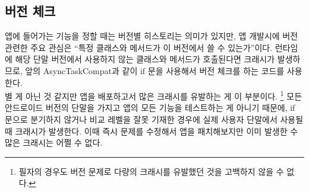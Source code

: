 \subsection{버전 체크}
앱에 들어가는 기능을 정할 때는 버전별 히스토리는 의미가 있지만, 앱 개발시에 버전 관련한 주요 관심은 ``특정 클래스와 메서드가 이 버전에서 쓸 수 있는가''이다.
런타임에 해당 단말 버전에서 사용하지 않는 클래스와 메서드가 호출된다면 크래시가 발생하므로, 앞의 AsyncTaskCompat과 같이 if 문을 사용해서 버전 체크를 하는 코드를 사용한다.\\

별 게 아닌 것 같지만 앱을 배포하고서 많은 크래시를 유발하는 게 이 부분이다.
\footnote{필자의 경우도 버전 문제로 다량의 크래시를 유발했던 것을 고백하지 않을 수 없다.}
모든 안드로이드 버전의 단말을 가지고 앱의 모든 기능을 테스트하는 게 아니기 때문에, if 문으로 분기하지 않거나 비교 레벨을 잘못 기재한 경우에 실제 사용자 단말에서 사용될 때 크래시가 발생한다. 이때 즉시 문제를 수정해서 앱을 패치해보지만 이미 발생한 수많은 크래시는 어쩔 수 없다.\\

